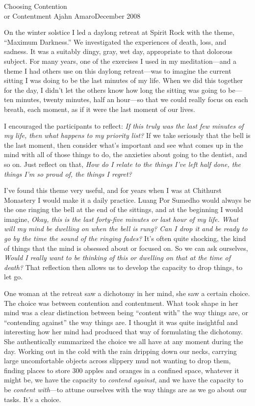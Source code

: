 {Choosing Contention\\or Contentment}
{Ajahn Amaro}{December 2008}

On the winter solstice I led a daylong retreat at Spirit Rock with the 
theme, ``Maximum Darkness.'' We investigated the experiences of death, 
loss, and sadness. It was a suitably dingy, gray, wet day, appropriate 
to that dolorous subject. For many years, one of the exercises I used 
in my meditation---and a theme I had others use on this daylong 
retreat---was to imagine the current sitting I was doing to be the last 
minutes of my life. When we did this together for the day, I didn't let 
the others know how long the sitting was going to be---ten minutes, 
twenty minutes, half an hour---so that we could really focus on each 
breath, each moment, as if it were the last moment of our lives.

I encouraged the participants to reflect: \emph{If this truly was the 
last few minutes of my life, then what happens to my priority list?} If 
we take seriously that the bell is the last moment, then consider 
what's important and see what comes up in the mind with all of those 
things to do, the anxieties about going to the dentist, and so on. Just 
reflect on that, \emph{How do I relate to the things I've left half 
done, the things I'm so proud of, the things I regret?}

I've found this theme very useful, and for years when I was at 
Chithurst Monastery I would make it a daily practice. Luang Por Sumedho 
would always be the one ringing the bell at the end of the sittings, 
and at the beginning I would imagine, \emph{Okay, this is the last 
forty-five minutes or last hour of my life. What will my mind be 
dwelling on when the bell is rung? Can I drop it and be ready to go by 
the time the sound of the ringing fades?} It's often quite shocking, 
the kind of things that the mind is obsessed about or focused on. So we 
can ask ourselves, \emph{Would I really want to be thinking of this or 
dwelling on that at the time of death?} That reflection then allows us 
to develop the capacity to drop things, to let go.

One woman at the retreat saw a dichotomy in her mind, she saw a certain 
choice. The choice was between contention and contentment. What took 
shape in her mind was a clear distinction between being ``content 
with'' the way things are, or ``contending against'' the way things 
are. I thought it was quite insightful and interesting how her mind had 
produced that way of formulating the dichotomy. She authentically 
summarized the choice we all have at any moment during the day. Working 
out in the cold with the rain dripping down our necks, carrying large 
uncomfortable objects across slippery mud not wanting to drop them, 
finding places to store 300 apples and oranges in a confined space, 
whatever it might be, we have the capacity to \emph{contend against}, 
and we have the capacity to be \emph{content with}---to attune 
ourselves with the way things are as we go about our tasks. It's a 
choice.

